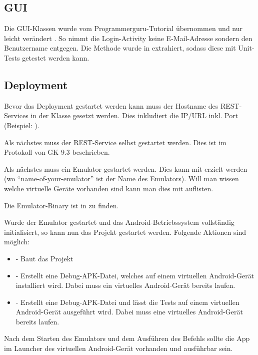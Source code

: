 \subsection{GUI}
Die GUI-Klassen wurde vom Programmerguru-Tutorial \cite{programmerguru-online} übernommen und nur leicht verändert \cite{programmerguru-online}. So nimmt die Login-Activity keine E-Mail-Adresse sondern den Benutzername entgegen. Die Methode  wurde in  extrahiert, sodass diese mit Unit-Tests getestet werden kann. 
  

\subsection{Deployment}
Bevor das Deployment gestartet werden kann muss der Hostname des REST-Services in der Klasse  gesetzt werden. Dies inkludiert die IP/URL inkl. Port \newline(Beispiel: ).

Als nächstes muss der REST-Service selbst gestartet werden. Dies ist im Protokoll von GK 9.3 beschrieben.


Als nächstes muss ein Emulator gestartet werden. Dies kann mit  erzielt werden (wo ``name-of-your-emulator'' ist der Name des Emulators). Will man wissen welche virtuelle Geräte vorhanden sind kann man dies mit  auflisten. \cite{stackoverflow-launch}

Die Emulator-Binary ist in  zu finden.

Wurde der Emulator gestartet und das Android-Betriebssystem vollständig initialisiert, so kann nun das Projekt gestartet werden. Folgende Aktionen sind möglich:
\begin{itemize}
	\item {} - Baut das Projekt
	\item {} - Erstellt eine Debug-APK-Datei, welches auf einem virtuellen Android-Gerät installiert wird. Dabei muss ein virtuelles Android-Gerät bereits laufen.
	\item {} - Erstellt eine Debug-APK-Datei und lässt die Tests auf einem virtuellen Android-Gerät ausgeführt wird. Dabei muss eine virtuelles Android-Gerät bereits laufen.
\end{itemize}

Nach dem Starten des Emulators und dem Ausführen des Befehls  sollte die App im Launcher des virtuellen Android-Gerät vorhanden und ausführbar sein.



